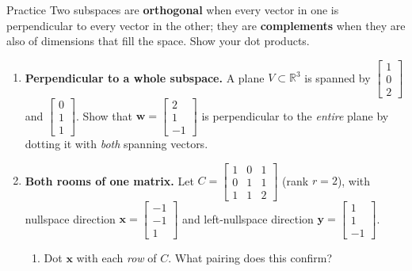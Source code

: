 \documentclass[10pt]{article}
\newcommand{\ww}{\mathbf{w}}
\newcommand{\xx}{\mathbf{x}}
\newcommand{\yy}{\mathbf{y}}
\begin{document}
\namedateperiod

\vspace{0.12in}

\begin{notesbox}{Practice}
Two subspaces are \textbf{orthogonal} when every vector in one is perpendicular to every vector in the
other; they are \textbf{complements} when they are also of dimensions that fill the space. Show your
dot products.

\begin{enumerate}[leftmargin=1.9em, itemsep=11pt]
  \item \textbf{Perpendicular to a whole subspace.} A plane $V\subset\mathbb{R}^3$ is spanned by
        $\begin{bmatrix} 1\\0\\2 \end{bmatrix}$ and $\begin{bmatrix} 0\\1\\1 \end{bmatrix}$. Show that
        $\ww=\begin{bmatrix} 2\\1\\-1 \end{bmatrix}$ is perpendicular to the \emph{entire} plane by
        dotting it with \emph{both} spanning vectors. 
  \item \textbf{Both rooms of one matrix.} Let
        $C=\begin{bmatrix} 1 & 0 & 1 \\ 0 & 1 & 1 \\ 1 & 1 & 2 \end{bmatrix}$ (rank $r=2$), with
        nullspace direction $\xx=\begin{bmatrix} -1\\-1\\1 \end{bmatrix}$ and left-nullspace direction
        $\yy=\begin{bmatrix} 1\\1\\-1 \end{bmatrix}$.
    \begin{enumerate}[label=(\alph*), leftmargin=1.8em, itemsep=5pt]
      \item Dot $\xx$ with each \emph{row} of $C$. What pairing does this confirm? \vspace{0.9cm}

\end{enumerate}
\end{enumerate}
\end{notesbox}
\end{document}
